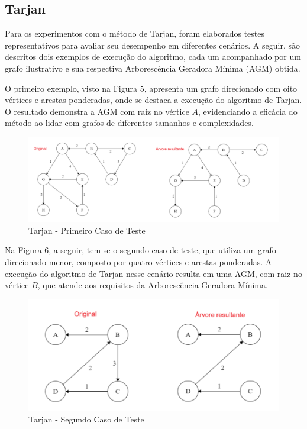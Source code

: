 \documentclass[12pt]{article}
\begin{document}
\subsection{Tarjan}

Para os experimentos com o método de Tarjan, foram elaborados testes representativos para avaliar seu desempenho em diferentes cenários. A seguir, são descritos dois exemplos de execução do algoritmo, cada um acompanhado por um grafo ilustrativo e sua respectiva Arborescência Geradora Mínima (AGM) obtida.

O primeiro exemplo, visto na Figura 5, apresenta um grafo direcionado com oito vértices e arestas ponderadas, onde se destaca a execução do algoritmo de Tarjan. O resultado demonstra a AGM com raiz no vértice \(A\), evidenciando a eficácia do método ao lidar com grafos de diferentes tamanhos e complexidades.

\begin{figure}[ht]
\centering
\includegraphics[width=1\textwidth]{AGM/caso1.png}
\caption{Tarjan - Primeiro Caso de Teste}
\end{figure}

Na Figura 6, a seguir, tem-se o segundo caso de teste, que utiliza um grafo direcionado menor, composto por quatro vértices e arestas ponderadas. A execução do algoritmo de Tarjan nesse cenário resulta em uma AGM, com raiz no vértice \(B\), que atende aos requisitos da Arborescência Geradora Mínima.

\begin{figure}[ht]
\centering
\includegraphics[width=.6\textwidth]{AGM/caso2.png}
\caption{Tarjan - Segundo Caso de Teste}
\end{figure}
\end{document}
